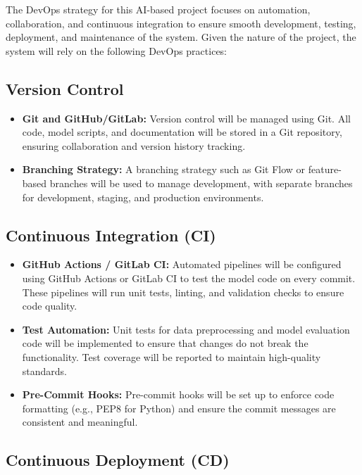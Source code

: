 \documentclass[15pt]{article}
\begin{document}
The DevOps strategy for this AI-based project focuses on automation, collaboration, and continuous integration to ensure smooth development, testing, deployment, and maintenance of the system. Given the nature of the project, the system will rely on the following DevOps practices:

\subsection{Version Control}

\begin{itemize}
    \item \textbf{Git and GitHub/GitLab:} Version control will be managed using Git. All code, model scripts, and documentation will be stored in a Git repository, ensuring collaboration and version history tracking.
    \item \textbf{Branching Strategy:} A branching strategy such as Git Flow or feature-based branches will be used to manage development, with separate branches for development, staging, and production environments.
\end{itemize}

\subsection{Continuous Integration (CI)}

\begin{itemize}
    \item \textbf{GitHub Actions / GitLab CI:} Automated pipelines will be configured using GitHub Actions or GitLab CI to test the model code on every commit. These pipelines will run unit tests, linting, and validation checks to ensure code quality.
    \item \textbf{Test Automation:} Unit tests for data preprocessing and model evaluation code will be implemented to ensure that changes do not break the functionality. Test coverage will be reported to maintain high-quality standards.
    \item \textbf{Pre-Commit Hooks:} Pre-commit hooks will be set up to enforce code formatting (e.g., PEP8 for Python) and ensure the commit messages are consistent and meaningful.
\end{itemize}

\subsection{Continuous Deployment (CD)}
\end{document}
